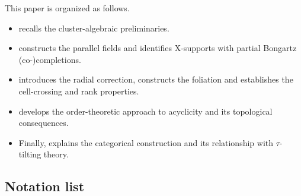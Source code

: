 \documentclass[11pt,reqno]{amsart}
\theoremstyle{plain}
\theoremstyle{definition}
\numberwithin{equation}{section}
\newcommand\<{\langle}
\renewcommand\>{\rangle}
\def\vv{\mathbf{v}}
\def\sink{X}
\newcommand{\ccpt}[1]{\mathrm{#1}}%
\def\xevo{\ccpt{X}}%
\def\xx{\mathbf{x}}%
\newcommand{\ol}[1]{\overline{#1}}
\newcommand{\DT}[1]{#1^{\vee}}
\def\Xevo{\DT{\ccpt{X}}}
\begin{document}

This paper is organized as follows.
\begin{itemize}
    \item {} recalls the cluster-algebraic preliminaries.
    \item {} constructs the parallel fields and identifies $\xevo$-supports with partial Bongartz (co-)completions.
    \item {} introduces the radial correction, constructs the foliation and establishes the cell-crossing and rank properties.
    \item {} develops the order-theoretic approach to acyclicity and its topological consequences.
    \item Finally,  explains the categorical construction and its relationship with $\tau$-tilting theory.
\end{itemize}

\subsection{Notation list}

\end{document}
